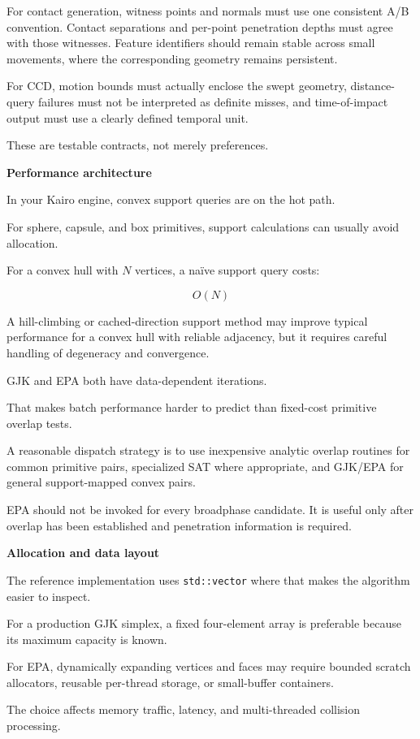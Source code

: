 For contact generation, witness points and normals must use one consistent A/B convention. Contact separations and per-point penetration depths must agree with those witnesses. Feature identifiers should remain stable across small movements, where the corresponding geometry remains persistent.

For CCD, motion bounds must actually enclose the swept geometry, distance-query failures must not be interpreted as definite misses, and time-of-impact output must use a clearly defined temporal unit.

These are testable contracts, not merely preferences.

\textbf{Performance architecture}

In your Kairo engine, convex support queries are on the hot path.

For sphere, capsule, and box primitives, support calculations can usually avoid allocation.

For a convex hull with \(N\) vertices, a naïve support query costs:

\[
O(N)
\]

A hill-climbing or cached-direction support method may improve typical performance for a convex hull with reliable adjacency, but it requires careful handling of degeneracy and convergence.

GJK and EPA both have data-dependent iterations.

That makes batch performance harder to predict than fixed-cost primitive overlap tests.

A reasonable dispatch strategy is to use inexpensive analytic overlap routines for common primitive pairs, specialized SAT where appropriate, and GJK/EPA for general support-mapped convex pairs.

EPA should not be invoked for every broadphase candidate. It is useful only after overlap has been established and penetration information is required.

\textbf{Allocation and data layout}

The reference implementation uses \texttt{std::vector} where that makes the algorithm easier to inspect.

For a production GJK simplex, a fixed four-element array is preferable because its maximum capacity is known.

For EPA, dynamically expanding vertices and faces may require bounded scratch allocators, reusable per-thread storage, or small-buffer containers.

The choice affects memory traffic, latency, and multi-threaded collision processing.

